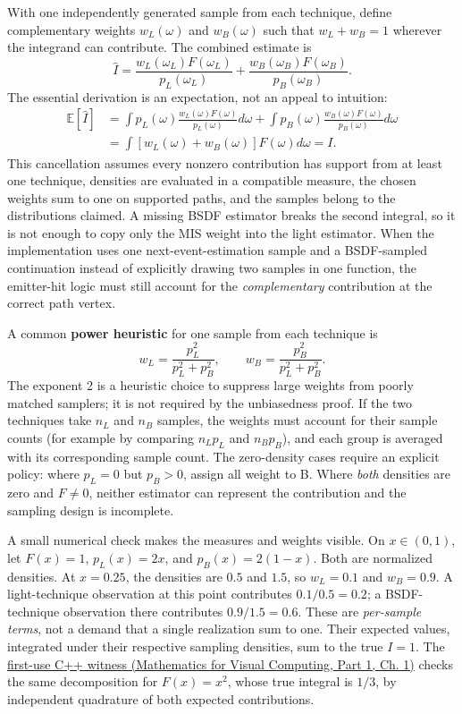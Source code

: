 With one independently generated sample from each technique, define complementary weights \(w_L(\omega)\) and \(w_B(\omega)\) such that \(w_L+w_B=1\) wherever the integrand can contribute. The combined estimate is \[
\widehat I=
 \frac{w_L(\omega_L)F(\omega_L)}{p_L(\omega_L)}
 +\frac{w_B(\omega_B)F(\omega_B)}{p_B(\omega_B)}.
\] The essential derivation is an expectation, not an appeal to intuition: \[
\begin{aligned}
\mathbb E[\widehat I]
&=\int p_L(\omega)\frac{w_L(\omega)F(\omega)}{p_L(\omega)}d\omega+
  \int p_B(\omega)\frac{w_B(\omega)F(\omega)}{p_B(\omega)}d\omega\\
&=\int [w_L(\omega)+w_B(\omega)]F(\omega)d\omega
=I.
\end{aligned}
\] This cancellation assumes every nonzero contribution has support from at least one technique, densities are evaluated in a compatible measure, the chosen weights sum to one on supported paths, and the samples belong to the distributions claimed. A missing BSDF estimator breaks the second integral, so it is not enough to copy only the MIS weight into the light estimator. When the implementation uses one next-event-estimation sample and a BSDF-sampled continuation instead of explicitly drawing two samples in one function, the emitter-hit logic must still account for the \emph{complementary} contribution at the correct path vertex.

A common \textbf{power heuristic} for one sample from each technique is \[
w_L=\frac{p_L^2}{p_L^2+p_B^2},\qquad
w_B=\frac{p_B^2}{p_L^2+p_B^2}.
\] The exponent 2 is a heuristic choice to suppress large weights from poorly matched samplers; it is not required by the unbiasedness proof. If the two techniques take \(n_L\) and \(n_B\) samples, the weights must account for their sample counts (for example by comparing \(n_Lp_L\) and \(n_Bp_B\)), and each group is averaged with its corresponding sample count. The zero-density cases require an explicit policy: where \(p_L=0\) but \(p_B>0\), assign all weight to B. Where \emph{both} densities are zero and \(F\ne0\), neither estimator can represent the contribution and the sampling design is incomplete.

A small numerical check makes the measures and weights visible. On \(x\in(0,1)\), let \(F(x)=1\), \(p_L(x)=2x\), and \(p_B(x)=2(1-x)\). Both are normalized densities. At \(x=0.25\), the densities are \(0.5\) and \(1.5\), so \(w_L=0.1\) and \(w_B=0.9\). A light-technique observation at this point contributes \(0.1/0.5=0.2\); a BSDF-technique observation there contributes \(0.9/1.5=0.6\). These are \emph{per-sample terms}, not a demand that a single realization sum to one. Their expected values, integrated under their respective sampling densities, sum to the true \(I=1\). The \href{../02-Mathematics-for-Visual-Computing-P01/main.pdf\#nameddest=source-file-a41016f2e326b40cdff18ff4}{first-use C++ witness (Mathematics for Visual Computing, Part 1, Ch. 1)} checks the same decomposition for \(F(x)=x^2\), whose true integral is \(1/3\), by independent quadrature of both expected contributions.

